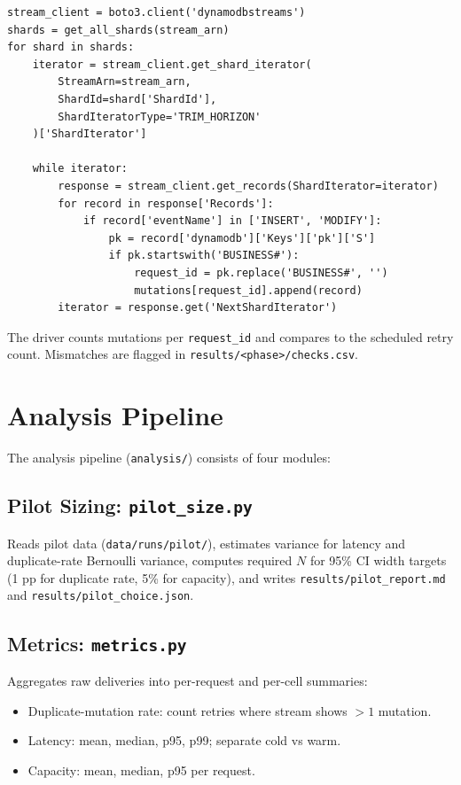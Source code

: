 \begin{verbatim}
stream_client = boto3.client('dynamodbstreams')
shards = get_all_shards(stream_arn)
for shard in shards:
    iterator = stream_client.get_shard_iterator(
        StreamArn=stream_arn,
        ShardId=shard['ShardId'],
        ShardIteratorType='TRIM_HORIZON'
    )['ShardIterator']
    
    while iterator:
        response = stream_client.get_records(ShardIterator=iterator)
        for record in response['Records']:
            if record['eventName'] in ['INSERT', 'MODIFY']:
                pk = record['dynamodb']['Keys']['pk']['S']
                if pk.startswith('BUSINESS#'):
                    request_id = pk.replace('BUSINESS#', '')
                    mutations[request_id].append(record)
        iterator = response.get('NextShardIterator')
\end{verbatim}

The driver counts mutations per \texttt{request\_id} and compares to the scheduled retry count. Mismatches are flagged in \texttt{results/<phase>/checks.csv}.

\section{Analysis Pipeline}

The analysis pipeline (\texttt{analysis/}) consists of four modules:

\subsection{Pilot Sizing: \texttt{pilot\_size.py}}

Reads pilot data (\texttt{data/runs/pilot/}), estimates variance for latency and duplicate-rate Bernoulli variance, computes required $N$ for 95\% CI width targets (1 pp for duplicate rate, 5\% for capacity), and writes \texttt{results/pilot\_report.md} and \texttt{results/pilot\_choice.json}.

\subsection{Metrics: \texttt{metrics.py}}

Aggregates raw deliveries into per-request and per-cell summaries:

\begin{itemize}
    \item Duplicate-mutation rate: count retries where stream shows $>1$ mutation.
    \item Latency: mean, median, p95, p99; separate cold vs warm.
    \item Capacity: mean, median, p95 per request.
\end{itemize}


